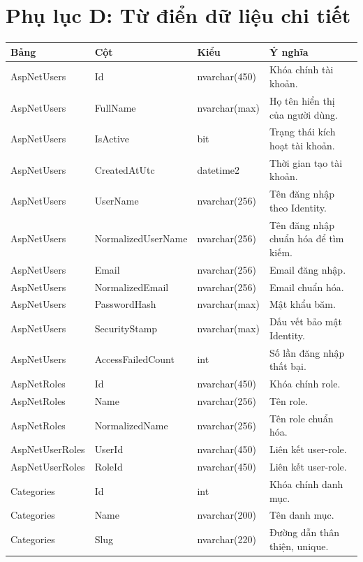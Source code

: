 \documentclass[12pt,a4paper]{article}
\begin{document}
\section*{Phụ lục D: Từ điển dữ liệu chi tiết}

\renewcommand{\arraystretch}{1.33}

\begin{longtable}{p{3.8cm}p{3.8cm}p{3.0cm}p{6.5cm}}
	\toprule
	\textbf{Bảng} & \textbf{Cột} & \textbf{Kiểu} & \textbf{Ý nghĩa} \\
	\midrule
	AspNetUsers & Id & nvarchar(450) & Khóa chính tài khoản. \\
	AspNetUsers & FullName & nvarchar(max) & Họ tên hiển thị của người dùng. \\
	AspNetUsers & IsActive & bit & Trạng thái kích hoạt tài khoản. \\
	AspNetUsers & CreatedAtUtc & datetime2 & Thời gian tạo tài khoản. \\
	AspNetUsers & UserName & nvarchar(256) & Tên đăng nhập theo Identity. \\
	AspNetUsers & NormalizedUserName & nvarchar(256) & Tên đăng nhập chuẩn hóa để tìm kiếm. \\
	AspNetUsers & Email & nvarchar(256) & Email đăng nhập. \\
	AspNetUsers & NormalizedEmail & nvarchar(256) & Email chuẩn hóa. \\
	AspNetUsers & PasswordHash & nvarchar(max) & Mật khẩu băm. \\
	AspNetUsers & SecurityStamp & nvarchar(max) & Dấu vết bảo mật Identity. \\
	AspNetUsers & AccessFailedCount & int & Số lần đăng nhập thất bại. \\
	AspNetRoles & Id & nvarchar(450) & Khóa chính role. \\
	AspNetRoles & Name & nvarchar(256) & Tên role. \\
	AspNetRoles & NormalizedName & nvarchar(256) & Tên role chuẩn hóa. \\
	AspNetUserRoles & UserId & nvarchar(450) & Liên kết user-role. \\
	AspNetUserRoles & RoleId & nvarchar(450) & Liên kết user-role. \\
	Categories & Id & int & Khóa chính danh mục. \\
	Categories & Name & nvarchar(200) & Tên danh mục. \\
	Categories & Slug & nvarchar(220) & Đường dẫn thân thiện, unique. \\

\end{longtable}
\end{document}
